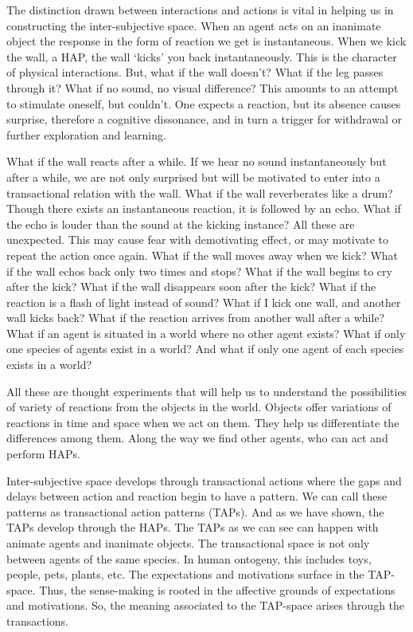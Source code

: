 The distinction drawn between interactions and actions is vital in helping us in constructing the inter-subjective space. When an agent acts on an inanimate object the response in the form of reaction we get is instantaneous. When we kick the wall, a HAP, the wall `kicks' you back instantaneously. This is the character of physical interactions.  But, what if the wall doesn't? What if the leg passes through it? What if no sound, no visual difference?  This amounts to an attempt to stimulate oneself, but couldn't. One expects a reaction, but its absence causes surprise, therefore a cognitive dissonance, and in turn a trigger for withdrawal or further exploration and learning. 

What if the wall reacts after a while. If we hear no sound instantaneously but after a while, we are not only surprised but will be motivated to enter into a transactional relation with the wall. What if the wall reverberates like a drum? Though there exists an instantaneous reaction, it is followed by an echo.  What if the echo is louder than the sound at the kicking instance? All these are unexpected. This may cause fear with demotivating effect, or may motivate to repeat the action once again. What if the wall moves away when we kick? What if the wall echos back only two times and stops? What if the wall begins to cry after the kick? What if the wall disappears soon after the kick? What if the reaction is a flash of light instead of sound? What if I kick one wall, and another wall kicks back? What if the reaction arrives from another wall after a while? What if an agent is situated in a world where no other agent exists? What if only one species of agents exist in a world? And what if only one agent of each species exists in a world? 

All these are thought experiments that will help us to understand the possibilities of variety of reactions from the objects in the world. Objects offer variations of reactions in time and space when we act on them. They help us differentiate the differences among them. Along the way we find other agents, who can act and perform HAPs. 

Inter-subjective space develops through transactional actions where the gaps and delays between action and reaction begin to have a pattern. We can call these patterns as transactional action patterns (TAPs). And as we have shown, the TAPs develop through the HAPs. The TAPs as we can see can happen with animate agents and inanimate objects. The transactional space is not only between agents of the same species. In human ontogeny, this includes toys, people, pets, plants, etc. The expectations and motivations surface in the TAP-space. Thus, the sense-making is rooted in the affective grounds of expectations and motivations. So, the meaning associated to the TAP-space arises through the transactions. 

